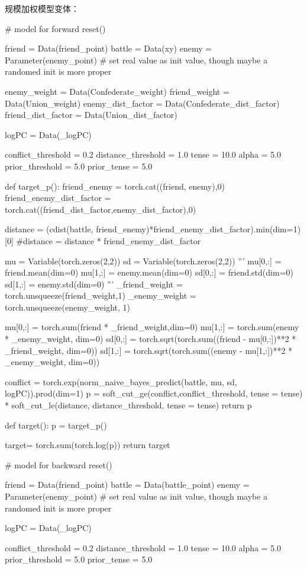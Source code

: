 \documentclass{sicnuthesis}
\begin{document}
规模加权模型变体：

\begin{python}
# model for forward
reset()

friend = Data(friend_point)
battle = Data(xy)
enemy = Parameter(enemy_point) # set real value as init value, though maybe a randomed init is more proper

enemy_weight = Data(Confederate_weight)
friend_weight = Data(Union_weight)
enemy_dist_factor = Data(Confederate_dist_factor)
friend_dist_factor = Data(Union_dist_factor)


logPC = Data(_logPC)

conflict_threshold = 0.2
distance_threshold = 1.0
tense = 10.0
alpha = 5.0
prior_threshold = 5.0
prior_tense = 5.0

def target_p():
    friend_enemy = torch.cat((friend, enemy),0)
    friend_enemy_dist_factor = torch.cat((friend_dist_factor,enemy_dist_factor),0)
    
    distance = (cdist(battle, friend_enemy)*friend_enemy_dist_factor).min(dim=1)[0]
    #distance = distance * friend_enemy_dist_factor

    mu = Variable(torch.zeros(2,2)) 
    sd = Variable(torch.zeros(2,2))
    '''
    mu[0,:] = friend.mean(dim=0)
    mu[1,:] = enemy.mean(dim=0)
    sd[0,:] = friend.std(dim=0)
    sd[1,:] = enemy.std(dim=0)
    '''
    _friend_weight = torch.unsqueeze(friend_weight,1)
    _enemy_weight  = torch.unsqueeze(enemy_weight, 1)
    
    mu[0,:] = torch.sum(friend * _friend_weight,dim=0)
    mu[1,:] = torch.sum(enemy  * _enemy_weight, dim=0)
    sd[0,:] = torch.sqrt(torch.sum((friend - mu[0,:])**2 * _friend_weight, dim=0))
    sd[1,:] = torch.sqrt(torch.sum((enemy  - mu[1,:])**2 * _enemy_weight, dim=0))
    
    conflict = torch.exp(norm_naive_bayes_predict(battle, mu, sd, logPC)).prod(dim=1)
    p = soft_cut_ge(conflict,conflict_threshold, tense = tense) * soft_cut_le(distance, distance_threshold, tense = tense)
    return p

def target():
    p = target_p()
    
    target= torch.sum(torch.log(p))
    return target
    
# model for backward
reset()

friend = Data(friend_point)
battle = Data(battle_point)
enemy = Parameter(enemy_point) # set real value as init value, though maybe a randomed init is more proper

logPC = Data(_logPC)

conflict_threshold = 0.2
distance_threshold = 1.0
tense = 10.0
alpha = 5.0
prior_threshold = 5.0
prior_tense = 5.0


\end{python}
\end{document}
